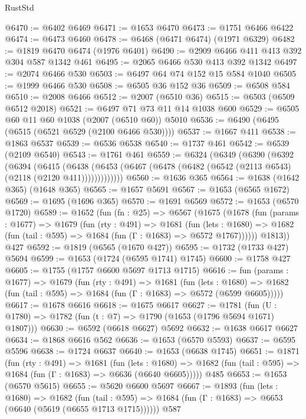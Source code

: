 \begin{lexlean}{RustStd}
\begin{coremodule}
{\begin{coremodule}
{{{{{{{{{{{{{{{{@6470 := @6402 @6469
@6471 := @1653 @6470
@6473 := @1751 @6466 @6422
@6474 := @6473 @6460
@6478 := @6468 (@6471 @6474) (@1971 @6329)
@6482 := @1819 @6470 @6474 (@1976 @6401)
@6490 := @2909 @6466 @411 @413 @392 @304 @587 @1342 @461
@6495 := @2065 @6466 @530 @413 @392 @1342
@6497 := @2074 @6466 @530
@6503 := @6497 @64 @74 @152 @15 @584 @1040
@6505 := @1999 @6466 @530
@6508 := @6505 @36 @152 @36
@6509 := @6508 @584
@6510 := @2008 @6466
@6512 := @2007 (@6510 @36)
@6515 := @6503 (@6509 @6512 @2018)
@6521 := @6497 @71 @73 @11 @14 @1038 @600
@6529 := @6505 @60 @11 @60 @1038 (@2007 (@6510 @60)) @5010
@6536 := @6490 (@6495 (@6515 (@6521 @6529 (@2100 @6466 @530))))
@6537 := @1667 @411
@6538 := @1863 @6537
@6539 := @6536 @6538
@6540 := @1737 @461
@6542 := @6539 (@2109 @6540)
@6543 := @1761 @461
@6559 := @6324
    (@6349
      (@6390
        (@6392
          (@6394
            (@6415
              (@6438
                (@6453 (@6467 (@6478 (@6482 (@6542 (@2113 @6543) (@2118 (@2120 @411)))))))))))))
@6560 := @1636 @365
@6564 := @1638 (@1642 @365) (@1648 @365)
@6565 := @1657 @5691
@6567 := @1653 (@6565 @1672)
@6569 := @1695 (@1696 @365)
@6570 := @1691 @6569
@6572 := @1653 (@6570 @1720)
@6589 := @1652
    (fun (fn : @25) =>
    @6567
      (@1675
        (@1678
          (fun (params : @1677) =>
          @1679
            (fun (rty : @491) =>
            @1681
              (fun (lets : @1680) =>
              @1682 (fun (tail : @595) => @1684 (fun (Γ : @1683) => @6572 @1767))))))
        @1813))
    @427
@6592 := @1819 (@6565 (@1670 @427))
@6595 := @1732 (@1733 @427) @5694
@6599 := @1653 (@1724 (@6595 @1741) @1745)
@6600 := @1758 @427
@6605 := @1755 (@1757 @6600 @5697 @1713 @1715)
@6616 := fun (params : @1677) =>
  @1679
    (fun (rty : @491) =>
    @1681
      (fun (lets : @1680) =>
      @1682 (fun (tail : @595) => @1684 (fun (Γ : @1683) => @6572 (@6599 @6605)))))
@6617 := @1678 @6616
@6618 := @1675 @6617
@6627 := @1781 (fun (U : @1780) => @1782 (fun (t : @7) => @1790 (@1653 (@1796 @5694 @1671) @1807)))
@6630 := @6592 (@6618 @6627) @5692
@6632 := @1638 @6617 @6627
@6634 := @1868 @6616 @562
@6636 := @1653 (@6570 @5593)
@6637 := @6595 @5596
@6638 := @1724 @6637
@6640 := @1653 (@6638 @1745)
@6651 := @1871
    (fun (rty : @491) =>
    @1681
      (fun (lets : @1680) =>
      @1682 (fun (tail : @595) => @1684 (fun (Γ : @1683) => @6636 (@6640 @6605)))))
    @485
@6653 := @1653 (@6570 @5615)
@6655 := @5620 @6600 @5697
@6667 := @1893
    (fun (lets : @1680) =>
    @1682
      (fun (tail : @595) => @1684 (fun (Γ : @1683) => @6653 (@6640 (@5619 (@6655 @1713 @1715))))))
    @587
}}}}}}}}}}}}}}}}
\end{coremodule}}
\end{coremodule}
\end{lexlean}
